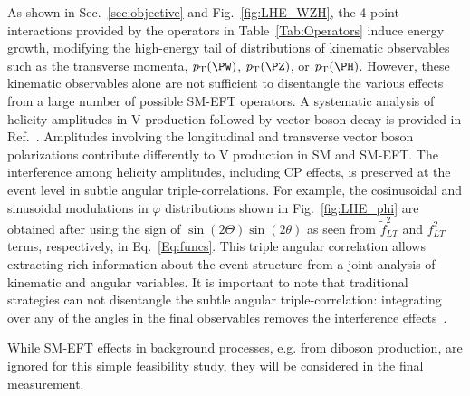 \documentclass[a4paper,11pt]{article}
\newcommand{\Pb}{{{\Pqb}}\xspace}
\newcommand{\PAb}{{{{\Paqb}}}\xspace}
\renewcommand{\PV}{{{{V}}}\xspace}
\newcommand{\VH}{{{\PV}{\PH}}\xspace}
\begin{document}


As shown in Sec.~\ref{sec:objective} and Fig.~\ref{fig:LHE_WZH}, the 4-point interactions provided by the operators in Table~\ref{Tab:Operators} induce  energy growth, modifying the high-energy tail of distributions of kinematic observables such as the transverse momenta, $\pt(\PW)$, $\pt(\PZ)$, or $\pt(\PH)$. 
However, these kinematic observables alone are not sufficient to disentangle the various effects from a large number of possible SM-EFT operators. 
A systematic analysis of helicity amplitudes in \VH production followed by vector boson decay is provided in Ref.~\cite{Banerjee:2019twi}. 
Amplitudes involving the longitudinal and transverse vector boson polarizations contribute differently to \VH production in SM and SM-EFT. 
The interference among helicity amplitudes, including CP effects, is preserved at the event level in subtle angular triple-correlations. 
For example, the cosinusoidal and sinusoidal modulations in $\varphi$ distributions shown in Fig.~\ref{fig:LHE_phi} are obtained after using the sign of $\sin\left(2\Theta\right)\sin\left(2\theta\right)$ as seen from $\tilde{f}^2_{LT}$ and $f^2_{LT}$ terms, respectively, in  Eq.~\ref{Eq:funcs}. 
This triple angular correlation allows extracting rich information about the event structure from a joint analysis of kinematic and angular variables.
%
It is important to note that traditional strategies can not disentangle the subtle angular triple-correlation: integrating over any of the angles in the final observables removes the interference effects~\cite{Panico:2017frx}.

While SM-EFT effects in background processes, e.g. from diboson production, are ignored for this simple feasibility study, they will be considered in the final measurement.
\end{document}
